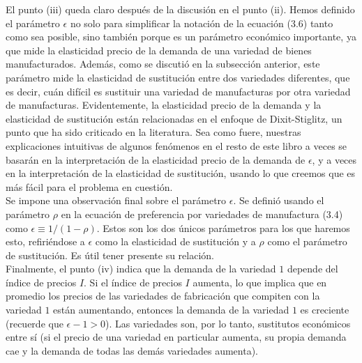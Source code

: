 El punto (iii) queda claro después de la discusión en el punto (ii). Hemos definido el parámetro $\epsilon$ no solo para simplificar la notación de la ecuación (3.6) tanto como sea posible, sino también porque es un parámetro económico importante, ya que mide la elasticidad precio de la demanda de una variedad de bienes manufacturados. Además, como se discutió en la subsección anterior, este parámetro mide la elasticidad de sustitución entre dos variedades diferentes, que es decir, cuán difícil es sustituir una variedad de manufacturas por otra variedad de manufacturas. Evidentemente, la elasticidad precio de la demanda y la elasticidad de sustitución están relacionadas en el enfoque de Dixit-Stiglitz, un punto que ha sido criticado en la literatura.  Sea como fuere, nuestras explicaciones intuitivas de algunos fenómenos en el resto de este libro a veces se basarán en la interpretación de la elasticidad precio de la demanda de $\epsilon$, y a veces en la interpretación de la elasticidad de sustitución, usando lo que creemos que es más fácil para el problema en cuestión.\\
Se impone una observación final sobre el parámetro $\epsilon$. Se definió usando el parámetro $\rho$ en la ecuación de preferencia por variedades de manufactura (3.4) como $\epsilon \equiv 1/(1-\rho)$. Estos son los dos únicos parámetros para los que haremos esto, refiriéndose a $\epsilon$ como la elasticidad de sustitución y a $\rho$ como el parámetro de sustitución. Es útil tener presente su relación.\\
Finalmente, el punto (iv) indica que la demanda de la variedad $1$ depende del índice de precios $I$. Si el índice de precios $I$ aumenta, lo que implica que en promedio los precios de las variedades de fabricación que compiten con la variedad $1$ están aumentando, entonces la demanda de la variedad $1$ es creciente (recuerde que $\epsilon-1>0$). Las variedades son, por lo tanto, sustitutos económicos entre sí (si el precio de una variedad en particular aumenta, su propia demanda cae y la demanda de todas las demás variedades aumenta).\\
